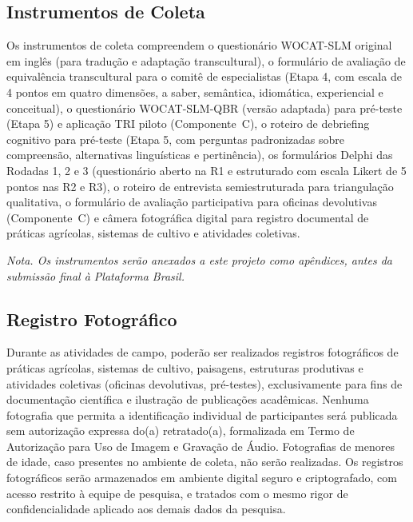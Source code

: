 \documentclass[12pt,a4paper,brazil]{article}
\begin{document}
\subsection{Instrumentos de Coleta}

Os instrumentos de coleta compreendem o questionário WOCAT-SLM original em inglês (para tradução e adaptação transcultural), o formulário de avaliação de equivalência transcultural para o comitê de especialistas (Etapa 4, com escala de 4 pontos em quatro dimensões, a saber, semântica, idiomática, experiencial e conceitual), o questionário WOCAT-SLM-QBR (versão adaptada) para pré-teste (Etapa 5) e aplicação TRI piloto (Componente~C), o roteiro de debriefing cognitivo para pré-teste (Etapa 5, com perguntas padronizadas sobre compreensão, alternativas linguísticas e pertinência), os formulários Delphi das Rodadas 1, 2 e 3 (questionário aberto na R1 e estruturado com escala Likert de 5 pontos nas R2 e R3), o roteiro de entrevista semiestruturada para triangulação qualitativa, o formulário de avaliação participativa para oficinas devolutivas (Componente~C) e câmera fotográfica digital para registro documental de práticas agrícolas, sistemas de cultivo e atividades coletivas.

\textit{Nota. Os instrumentos serão anexados a este projeto como apêndices, antes da submissão final à Plataforma Brasil.}

\subsection{Registro Fotográfico}

Durante as atividades de campo, poderão ser realizados registros fotográficos de práticas agrícolas, sistemas de cultivo, paisagens, estruturas produtivas e atividades coletivas (oficinas devolutivas, pré-testes), exclusivamente para fins de documentação científica e ilustração de publicações acadêmicas. Nenhuma fotografia que permita a identificação individual de participantes será publicada sem autorização expressa do(a) retratado(a), formalizada em Termo de Autorização para Uso de Imagem e Gravação de Áudio. Fotografias de menores de idade, caso presentes no ambiente de coleta, não serão realizadas. Os registros fotográficos serão armazenados em ambiente digital seguro e criptografado, com acesso restrito à equipe de pesquisa, e tratados com o mesmo rigor de confidencialidade aplicado aos demais dados da pesquisa.


\end{document}
